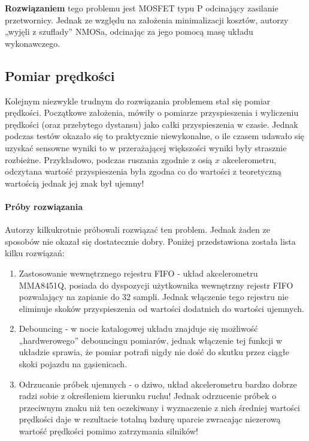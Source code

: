         \textbf{Rozwiązaniem} tego problemu jest MOSFET typu P odcinający zasilanie przetwornicy.
        Jednak ze względu na założenia minimalizacji kosztów, autorzy „wyjęli z szuflady” NMOSa, odcinając za jego pomocą masę układu wykonawczego.


    \subsection{Pomiar prędkości}
        \tab Kolejnym niezwykle trudnym do rozwiązania problemem stał się pomiar prędkości.
        Początkowe założenia, mówiły o pomiarze przyspieszenia i wyliczeniu prędkości (oraz przebytego dystansu) jako całki przyspieszenia w czasie.
        Jednak podczas testów okazało się to praktycznie niewykonalne, o ile czasem udawało się uzyskać sensowne wyniki to w przerażającej większości wyniki były strasznie rozbieżne.
        Przykładowo, podczas ruszania zgodnie z osią $x$ akcelerometru, odczytana wartość przyspieszenia była zgodna co do wartości z teoretyczną wartością jednak jej znak był ujemny!

        \paragraph{Próby rozwiązania\\}
        Autorzy kilkukrotnie próbowali rozwiązać ten problem. 
        Jednak żaden ze sposobów nie okazał się dostatecznie dobry.
        Poniżej przedstawiona została lista kilku rozwiązań:
        \begin{enumerate}
            \item Zastosowanie wewnętrznego rejestru FIFO - układ akcelerometru MMA8451Q, posiada do dyspozycji użytkownika wewnętrzny rejestr FIFO pozwalający na zapianie do 32 sampli.
            Jednak włączenie tego rejestru nie eliminuje skoków przyspieszenia od wartości dodatnich do wartości ujemnych.
            \item Debouncing - w nocie katalogowej układu znajduje się możliwość „hardwerowego” debouncingu pomiarów, jednak włączenie tej funkcji w układzie sprawia, że pomiar potrafi nigdy nie dość do skutku przez ciągłe skoki pojazdu na gąsienicach.
            \item Odrzucanie próbek ujemnych - o dziwo, układ akcelerometru bardzo dobrze radzi sobie z określeniem kierunku ruchu! Jednak odrzucenie próbek o przeciwnym znaku niż ten oczekiwany i wyznaczenie z nich średniej wartości prędkości daje w rezultacie totalną bzdurę uparcie zwracając niezerową wartość prędkości pomimo zatrzymania silników!
        \end{enumerate}

